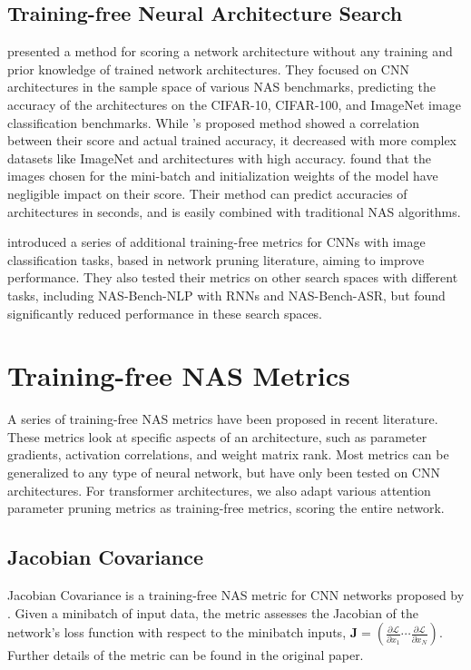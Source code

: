 \documentclass[11pt]{article}
\begin{document}
\subsection{Training-free Neural Architecture Search}
    \citet{mellor_neural_2021} presented a method for scoring a network architecture without any training and prior knowledge of trained network architectures. They focused on CNN architectures in the sample space of various NAS benchmarks, predicting the accuracy of the architectures on the CIFAR-10, CIFAR-100, and ImageNet image classification benchmarks. While \citeauthor{mellor_neural_2021}'s proposed method showed a correlation between their score and actual trained accuracy, it decreased with more complex datasets like ImageNet and architectures with high accuracy. \citeauthor{mellor_neural_2021} found that the images chosen for the mini-batch and initialization weights of the model have negligible impact on their score. Their method can predict accuracies of architectures in seconds, and is easily combined with traditional NAS algorithms.

    \citet{abdelfattah_zero-cost_2020} introduced a series of additional training-free metrics for CNNs with image classification tasks, based in network pruning literature, aiming to improve performance. They also tested  their metrics on other search spaces with different tasks, including NAS-Bench-NLP with RNNs and NAS-Bench-ASR, but found significantly reduced performance in these search spaces.

\section{Training-free NAS Metrics}
    A series of training-free NAS metrics have been proposed in recent literature. These metrics look at specific aspects of an architecture, such as parameter gradients, activation correlations, and weight matrix rank. Most metrics can be generalized to any type of neural network, but have only been tested on CNN architectures. For transformer architectures, we also adapt various attention parameter pruning metrics as training-free metrics, scoring the entire network.

\subsection{Jacobian Covariance}
    Jacobian Covariance is a training-free NAS metric for CNN networks proposed by \citet{mellor_neural_2021-1}. Given a minibatch of input data, the metric assesses the Jacobian of the network's loss function with respect to the minibatch inputs, $\mathbf{J} = \left(\frac{\partial\mathcal{L}}{\partial x_1}\cdots\frac{\partial\mathcal{L}}{\partial x_N}\right)$. Further details of the metric can be found in the original paper.
    
\end{document}
